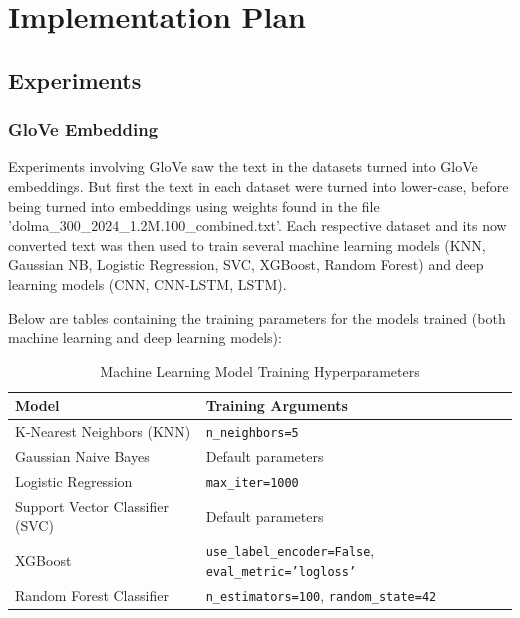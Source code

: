 \documentclass[stu,12pt,floatsintext,donotrepeattitle]{apa7}
\begin{document}
\clearpage
\section{Implementation Plan}

\subsection{Experiments}

\subsubsection{GloVe Embedding}
Experiments involving GloVe saw the text in the datasets turned into GloVe embeddings. But first the text in each dataset were turned into lower-case, before being turned into embeddings using weights found in the file 'dolma\_300\_2024\_1.2M.100\_combined.txt'. Each respective dataset and its now converted text was then used to train several machine learning models (KNN, Gaussian NB, Logistic Regression, SVC, XGBoost, Random Forest) and deep learning models (CNN, CNN-LSTM, LSTM). 

Below are tables containing the training parameters for the models trained (both machine learning and deep learning models): 

\begin{table}[H]
    \centering
    \caption{Machine Learning Model Training Hyperparameters}
    \label{tab:ml_model_params}
    \begin{tabular}{l l}
        \hline
        \textbf{Model} & \textbf{Training Arguments} \\
        \hline
        K-Nearest Neighbors (KNN) & \texttt{n\_neighbors=5} \\
        Gaussian Naive Bayes & Default parameters \\
        Logistic Regression & \texttt{max\_iter=1000} \\
        Support Vector Classifier (SVC) & Default parameters \\
        XGBoost & \texttt{use\_label\_encoder=False}, \texttt{eval\_metric='logloss'} \\
        Random Forest Classifier & \texttt{n\_estimators=100}, \texttt{random\_state=42} \\
        \hline
    \end{tabular}
\end{table}
\end{document}
